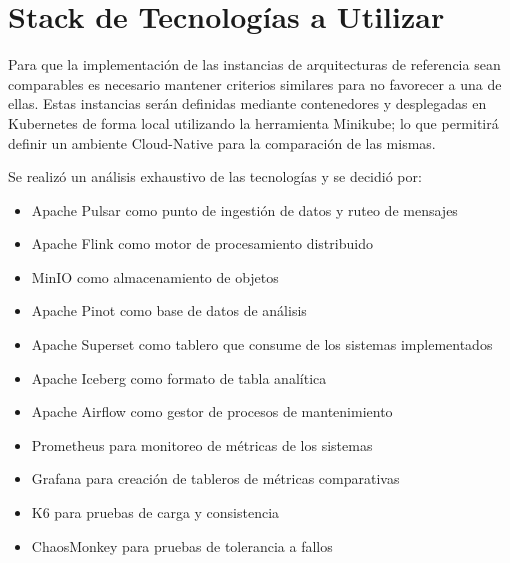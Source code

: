 \section{Stack de Tecnologías a Utilizar}

Para que la implementación de las instancias de arquitecturas de referencia sean comparables es necesario mantener criterios similares para no favorecer a una de ellas.
Estas instancias serán definidas mediante contenedores y desplegadas en Kubernetes de forma local utilizando la herramienta Minikube; 
lo que permitirá definir un ambiente Cloud-Native para la comparación de las mismas.

Se realizó un análisis exhaustivo de las tecnologías y se decidió por: 

\begin{itemize}
    \item Apache Pulsar como punto de ingestión de datos y ruteo de mensajes
    \item Apache Flink como motor de procesamiento distribuido
    \item MinIO como almacenamiento de objetos
    \item Apache Pinot como base de datos de análisis
    \item Apache Superset como tablero que consume de los sistemas implementados
    \item Apache Iceberg como formato de tabla analítica
    \item Apache Airflow como gestor de procesos de mantenimiento
    \item Prometheus para monitoreo de métricas de los sistemas
    \item Grafana para creación de tableros de métricas comparativas
    \item K6 para pruebas de carga y consistencia
    \item ChaosMonkey para pruebas de tolerancia a fallos
\end{itemize}
\newpage